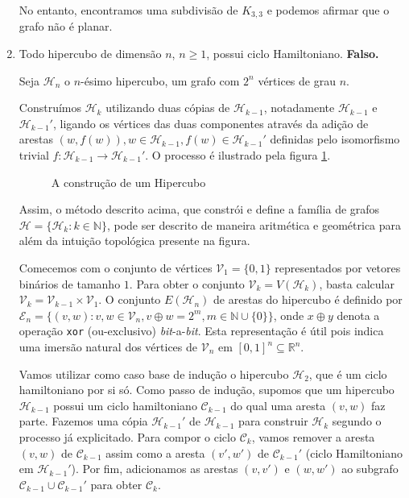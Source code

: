 \documentclass{homework}
\begin{document}
\begin{enumerate}[label=\textbf{\arabic*)}]
	No entanto, encontramos uma subdivisão de $K_{3, 3}$ e podemos afirmar que o grafo não é planar.
	
	\item Todo hipercubo de dimensão $n$, $n \ge 1$, possui ciclo Hamiltoniano. \textbf{Falso.}
	
	Seja $\mathscr{H}_n$ o $n$-ésimo hipercubo, um grafo com $2^n$ vértices de grau $n$. \par
	
	Construímos $\mathscr{H}_k$ utilizando duas cópias de $\mathscr{H}_{k-1}$, notadamente $\mathscr{H}_{k-1}$ e $\mathscr{H}_{k-1}'$, ligando os vértices das duas componentes através da adição de arestas $(w, f(w)), w \in \mathscr{H}_{k-1}, f(w) \in \mathscr{H}_{k-1}'$ definidas pelo isomorfismo trivial $f:\mathscr{H}_{k-1}\to\mathscr{H}_{k-1}'$. O processo é ilustrado pela figura \ref{fig:1.6.1}. \par

	\begin{figure}[H]
		\centering
		
		\caption{A construção de um Hipercubo}
		\label{fig:1.6.1}
	\end{figure}

	Assim, o método descrito acima, que constrói e define a família de grafos $\mathscr{H} = \{\mathscr{H}_{k} : k \in \mathbb{N}\}$, pode ser descrito de maneira aritmética e geométrica para além da intuição topológica presente na figura.\par
	
	Comecemos com o conjunto de vértices $\mathscr{V}_1 = \{0, 1\}$ representados por vetores binários de tamanho $1$. Para obter o conjunto $\mathscr{V}_k = V(\mathscr{H}_k)$, basta calcular $\mathscr{V}_k = \mathscr{V}_{k-1} \times \mathscr{V}_1$. O conjunto $E(\mathscr{H}_n)$ de arestas do hipercubo é definido por $\mathscr{E}_n = \{(v, w) : v, w \in \mathscr{V}_n, v \oplus w = 2^{m}, m \in \mathbb{N} \cup \{0\}\}$, onde $x \oplus y$ denota a operação \texttt{xor} (ou-exclusivo) \textit{bit}-a-\textit{bit}. Esta representação é útil pois indica uma imersão natural dos vértices de $\mathscr{V}_n$ em $[0, 1]^{n} \subseteq\mathbb{R}^n$.\par

	Vamos utilizar como caso base de indução o hipercubo $\mathscr{H}_2$, que é um ciclo hamiltoniano por si só. Como passo de indução, supomos que um hipercubo $\mathscr{H}_{k-1}$ possui um ciclo hamiltoniano $\mathscr{C}_{k-1}$ do qual uma aresta $(v, w)$ faz parte. Fazemos uma cópia $\mathscr{H}_{k-1}'$ de $\mathscr{H}_{k-1}$ para construir $\mathscr{H}_{k}$ segundo o processo já explicitado. Para compor o ciclo $\mathscr{C}_k$, vamos remover a aresta $(v, w)$ de $\mathscr{C}_{k-1}$ assim como a aresta $(v', w')$ de $\mathscr{C}_{k-1}'$ (ciclo Hamiltoniano em $\mathscr{H}_{k-1}'$). Por fim, adicionamos as arestas $(v, v')$ e $(w, w')$ ao subgrafo $\mathscr{C}_{k-1} \cup \mathscr{C}_{k-1}'$ para obter $\mathscr{C}_{k}$. \par


\end{enumerate}
\end{document}
